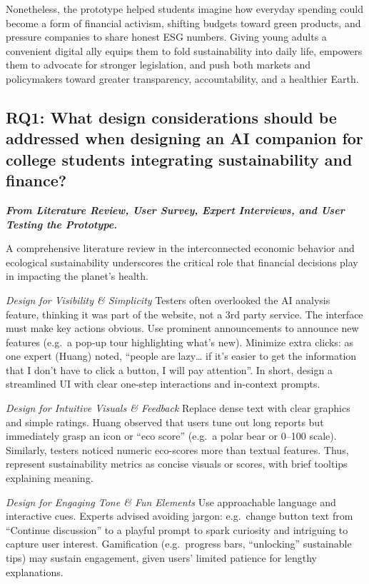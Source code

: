 \documentclass[
  12pt,
  letterpaper,
  DIV=11,
  numbers=noendperiod]{scrartcl}
\begin{document}
Nonetheless, the prototype helped students imagine how everyday spending
could become a form of financial activism, shifting budgets toward green
products, and pressure companies to share honest ESG numbers. Giving
young adults a convenient digital ally equips them to fold
sustainability into daily life, empowers them to advocate for stronger
legislation, and push both markets and policymakers toward greater
transparency, accountability, and a healthier Earth.

\subsection{RQ1: What design considerations should be addressed when
designing an AI companion for college students integrating
sustainability and
finance?}\label{rq1-what-design-considerations-should-be-addressed-when-designing-an-ai-companion-for-college-students-integrating-sustainability-and-finance}

\textbf{\emph{From Literature Review, User Survey, Expert Interviews,
and User Testing the Prototype.}}

A comprehensive literature review in the interconnected economic
behavior and ecological sustainability underscores the critical role
that financial decisions play in impacting the planet's health.

\emph{Design for Visibility \& Simplicity} Testers often overlooked the
AI analysis feature, thinking it was part of the website, not a 3rd
party service. The interface must make key actions obvious. Use
prominent announcements to announce new features (e.g.~a pop‐up tour
highlighting what's new). Minimize extra clicks: as one expert (Huang)
noted, ``people are lazy\ldots{} if it's easier to get the information
that I don't have to click a button, I will pay attention''. In short,
design a streamlined UI with clear one-step interactions and in-context
prompts.

\emph{Design for Intuitive Visuals \& Feedback} Replace dense text with
clear graphics and simple ratings. Huang observed that users tune out
long reports but immediately grasp an icon or ``eco score'' (e.g.~a
polar bear or 0--100 scale). Similarly, testers noticed numeric
eco-scores more than textual features. Thus, represent sustainability
metrics as concise visuals or scores, with brief tooltips explaining
meaning.

\emph{Design for Engaging Tone \& Fun Elements} Use approachable
language and interactive cues. Experts advised avoiding jargon:
e.g.~change button text from ``Continue discussion'' to a playful prompt
to spark curiosity and intriguing to capture user interest. Gamification
(e.g.~progress bars, ``unlocking'' sustainable tips) may sustain
engagement, given users' limited patience for lengthy explanations.
\end{document}
